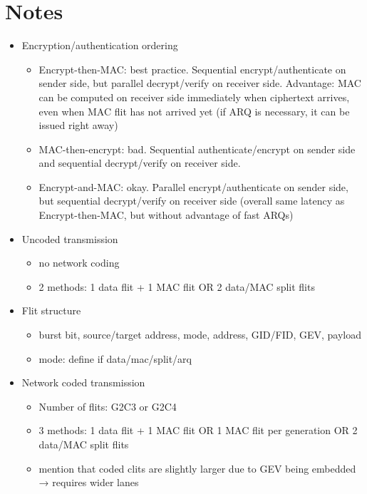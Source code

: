 \section{Notes}
\begin{itemize}
    \item Encryption/authentication ordering
        \begin{itemize}
            \item Encrypt-then-MAC: best practice. Sequential encrypt/authenticate on sender side, but parallel decrypt/verify
                on receiver side. Advantage: MAC can be computed on receiver side immediately when ciphertext arrives, even when
                MAC flit has not arrived yet (if ARQ is necessary, it can be issued right away)
            \item MAC-then-encrypt: bad. Sequential authenticate/encrypt on sender side and sequential decrypt/verify on receiver
                side.
            \item Encrypt-and-MAC: okay. Parallel encrypt/authenticate on sender side, but sequential decrypt/verify on receiver
                side (overall same latency as Encrypt-then-MAC, but without advantage of fast ARQs)
        \end{itemize}
    \item Uncoded transmission
        \begin{itemize}
            \item no network coding
            \item 2 methods: 1 data flit + 1 MAC flit OR 2 data/MAC split flits
        \end{itemize}
    \item Flit structure
        \begin{itemize}
            \item burst bit, source/target address, mode, address, GID/FID, GEV, payload
            \item mode: define if data/mac/split/arq
        \end{itemize}
    \item Network coded transmission
        \begin{itemize}
            \item Number of flits: G2C3 or G2C4
            \item 3 methods: 1 data flit + 1 MAC flit OR 1 MAC flit per generation OR 2 data/MAC split flits
            \item mention that coded clits are slightly larger due to GEV being embedded → requires wider lanes

\end{itemize}
\end{itemize}
